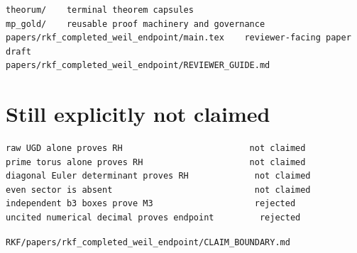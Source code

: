 \begin{verbatim}
theorum/    terminal theorem capsules
mp_gold/    reusable proof machinery and governance
papers/rkf_completed_weil_endpoint/main.tex    reviewer-facing paper draft
papers/rkf_completed_weil_endpoint/REVIEWER_GUIDE.md
\end{verbatim}

\hypertarget{still-explicitly-not-claimed}{%
\section{Still explicitly not claimed}\label{still-explicitly-not-claimed}}

\begin{verbatim}
raw UGD alone proves RH                         not claimed
prime torus alone proves RH                     not claimed
diagonal Euler determinant proves RH             not claimed
even sector is absent                            not claimed
independent b3 boxes prove M3                    rejected
uncited numerical decimal proves endpoint         rejected
\end{verbatim}

\begin{flushright}\small\texttt{RKF/papers/rkf\_completed\_weil\_endpoint/CLAIM\_BOUNDARY.md}\end{flushright}
